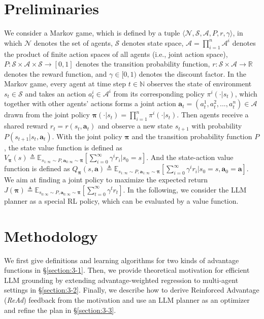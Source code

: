 \documentclass[11pt]{article}
\theoremstyle{plain}
\theoremstyle{remark}
\begin{document}
\section{Preliminaries}\label{sec:formulation}
We consider a Markov game, which is defined by a tuple $\langle \mathcal{N},\mathcal{S}, \boldsymbol{\mathcal{A}}, P, r, \gamma \rangle$, in which $\mathcal{N}$ denotes the set of agents, $\mathcal{S}$ denotes state space, $\boldsymbol{\mathcal{A}}=\prod_{i=1}^{n}\mathcal{A}^i$ denotes the product of finite action spaces of all agents (i.e., joint action space), $P: \mathcal{S}\times\boldsymbol{\mathcal{A}}\times\mathcal{S} \rightarrow [0,1]$ denotes the transition probability function, $r: \mathcal{S}\times\boldsymbol{\mathcal{A}}\rightarrow\mathbb{R}$ denotes the reward function, and $\gamma \in [0,1)$ denotes the discount factor. In the Markov game, every agent at time step $t \in \mathbb{N}$ observes the state of environment $s_t \in \mathcal{S}$ and takes an action $a_{t}^{i}\in \mathcal{A}^{i}$ from its corresponding policy $\pi^{i}(\cdot|s_t)$, which together with other agents' actions forms a joint action $\boldsymbol{a}_{t} = (a_{t}^{1}, a_{t}^{2}, ..., a_{t}^{n}) \in \boldsymbol{\mathcal{A}}$ drawn from the joint policy $\boldsymbol{\pi}(\cdot|s_t)=\prod_{i=1}^{n}\pi^{i}(\cdot|s_t)$. Then agents receive a shared reward $r_t=r(s_t,\boldsymbol{a}_t)$ and observe a new state $s_{t+1}$ with probability $P(s_{t+1}|s_t,\boldsymbol{a}_t)$. With the joint policy $\boldsymbol{\pi}$ and the transition probability function $P$, the state value function is defined as $V_{\boldsymbol{\pi}}(s) \triangleq \mathbb{E}_{s_{1:\infty}\sim P, \boldsymbol{a}_{0:\infty}\sim \boldsymbol{\pi}} [\sum_{i=0}^{\infty}\gamma^{i}r_i | s_0=s ]$. And the state-action value function is defined as $Q_{\boldsymbol{\pi}}(s, \boldsymbol{a})\triangleq\mathbb{E}_{s_{1:\infty}\sim P, \boldsymbol{a}_{1:\infty}\sim \boldsymbol{\pi}} [\sum_{i=0}^{\infty}\gamma^{i}r_i | s_0=s, \boldsymbol{a}_0=\boldsymbol{a}]$. We aim at finding a joint policy to maximize the expected return $J(\boldsymbol{\pi}) \triangleq \mathbb{E}_{s_{0:\infty} \sim P, \boldsymbol{a}_{0:\infty} \sim \boldsymbol{\pi}}\left[\sum_{t=0}^{\infty}\gamma^{t}r_t\right]$.
In the following, we consider the LLM planner as a special RL policy, which can be evaluated by a value function.

\vspace{-0.2em}
\section{Methodology}
\vspace{-0.2em}
We first give definitions and learning algorithms for two kinds of advantage functions in \S\ref{section:3-1}.
Then, we provide theoretical motivation for efficient LLM grounding by extending advantage-weighted regression to multi-agent settings in \S\ref{section:3-2}.
Finally, we describe how to derive Reinforced Advantage (\emph{ReAd}) feedback from the motivation and use an LLM planner as an optimizer and refine the plan in \S\ref{section:3-3}.
\end{document}
